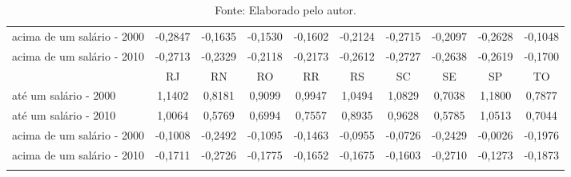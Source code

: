 \begin{table}[!ht]
{\begin{tabular}{lccccccccc}
    acima de um salário - 2000 & {\color[HTML]{FE0000} -0,2847} & {\color[HTML]{FE0000} -0,1635} & {\color[HTML]{FE0000} -0,1530} & {\color[HTML]{FE0000} -0,1602} & {\color[HTML]{FE0000} -0,2124} & {\color[HTML]{FE0000} -0,2715} & {\color[HTML]{FE0000} -0,2097} & {\color[HTML]{FE0000} -0,2628} & {\color[HTML]{FE0000} -0,1048} \\
    acima de um salário - 2010 & {\color[HTML]{FE0000} -0,2713} & {\color[HTML]{FE0000} -0,2329} & {\color[HTML]{FE0000} -0,2118} & {\color[HTML]{FE0000} -0,2173} & {\color[HTML]{FE0000} -0,2612} & {\color[HTML]{FE0000} -0,2727} & {\color[HTML]{FE0000} -0,2638} & {\color[HTML]{FE0000} -0,2619} & {\color[HTML]{FE0000} -0,1700} \\ \Xhline{2pt}
     & RJ & RN & RO & RR & RS & SC & SE & SP & TO \\ \cline{2-10} 
    até um salário - 2000 & {\color[HTML]{3531FF} 1,1402} & {\color[HTML]{3531FF} 0,8181} & {\color[HTML]{3531FF} 0,9099} & {\color[HTML]{3531FF} 0,9947} & {\color[HTML]{3531FF} 1,0494} & {\color[HTML]{3531FF} 1,0829} & {\color[HTML]{3531FF} 0,7038} & {\color[HTML]{3531FF} 1,1800} & {\color[HTML]{3531FF} 0,7877} \\
    até um salário - 2010 & {\color[HTML]{3531FF} 1,0064} & {\color[HTML]{3531FF} 0,5769} & {\color[HTML]{3531FF} 0,6994} & {\color[HTML]{3531FF} 0,7557} & {\color[HTML]{3531FF} 0,8935} & {\color[HTML]{3531FF} 0,9628} & {\color[HTML]{3531FF} 0,5785} & {\color[HTML]{3531FF} 1,0513} & {\color[HTML]{3531FF} 0,7044} \\
    acima de um salário - 2000 & {\color[HTML]{FE0000} -0,1008} & {\color[HTML]{FE0000} -0,2492} & {\color[HTML]{FE0000} -0,1095} & {\color[HTML]{FE0000} -0,1463} & {\color[HTML]{FE0000} -0,0955} & {\color[HTML]{FE0000} -0,0726} & {\color[HTML]{FE0000} -0,2429} & {\color[HTML]{FE0000} -0,0026} & {\color[HTML]{FE0000} -0,1976} \\
    acima de um salário - 2010 & {\color[HTML]{FE0000} -0,1711} & {\color[HTML]{FE0000} -0,2726} & {\color[HTML]{FE0000} -0,1775} & {\color[HTML]{FE0000} -0,1652} & {\color[HTML]{FE0000} -0,1675} & {\color[HTML]{FE0000} -0,1603} & {\color[HTML]{FE0000} -0,2710} & {\color[HTML]{FE0000} -0,1273} & {\color[HTML]{FE0000} -0,1873} \\ \Xhline{2pt}
    \end{tabular}}
    \label{tab:cap04:progressividadeestados}
    \caption*{\footnotesize{Fonte: Elaborado pelo autor.}}
\end{table}

\pagebreak

